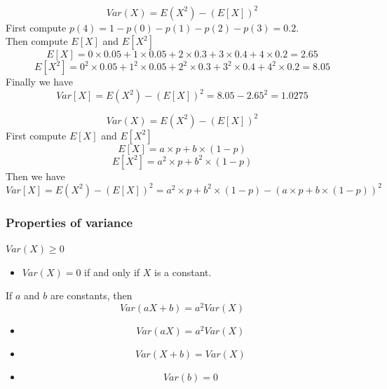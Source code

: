 \documentclass[slidestop,compress,mathserif]{beamer}
\begin{document}
\begin{frame}

\pause
\[
Var(X) 	  =  E(X^2)-(E[X])^2
\]
First compute $p(4) = 1 - p(0) - p(1) - p(2) - p(3) = 0.2$.\\
Then compute $E[X]$ and $E[X^2]$
\[ E[X] = 0 \times 0.05 + 1 \times 0.05 + 2 \times 0.3 + 3 \times 0.4 + 4 \times 0.2 = 2.65 \]
\[ E[X^2] = 0^2 \times 0.05 + 1^2 \times 0.05 + 2^2 \times 0.3 + 3^2 \times 0.4 + 4^2 \times 0.2 = 8.05\]
Finally we have 
\[Var[X] = E(X^2)-(E[X])^2 = 8.05 - 2.65^2 = 1.0275\]
\end{frame}


\begin{frame}

\pause
\[
Var(X) 	  =  E(X^2)-(E[X])^2
\]
First compute $E[X]$ and $E[X^2]$
\[ E[X] = a \times p + b \times (1 - p) \]
\[ E[X^2] = a^2 \times p + b^2 \times (1 - p)\]
Then we have 
\[Var[X] = E(X^2)-(E[X])^2 = a^2 \times p + b^2 \times (1 - p) - \left(a \times p + b \times (1 - p)\right) ^ 2\]
\end{frame}






\begin{frame}
\frametitle{Properties of variance}

$Var(X) \geq 0$
\begin{itemize}
\item $Var(X) = 0$ if and only if $X$ is a constant.
\end{itemize}


\vspace{0.2cm}
If $a$ and $b$ are constants, then
\[ Var(aX+b) = a^2 Var(X) \]


\begin{itemize}
\item \[ Var(aX) = a^2 Var(X) \]
\item \[ Var(X + b) =  Var(X) \]
\item \[ Var(b) = 0 \]
\end{itemize}

\end{frame}
\end{document}
